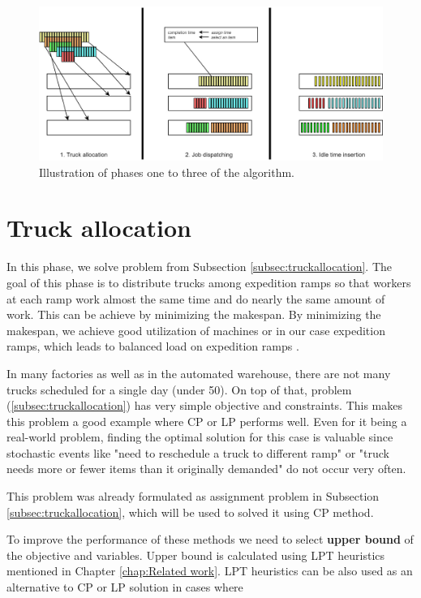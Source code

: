 \documentclass{ctuthesis}
\begin{document}
\begin{figure}[h]
\includegraphics[width=1.0\linewidth]{algo.jpg}
\caption{Illustration of phases one to three of the algorithm.}
\end{figure}

\section{Truck allocation}

In this phase, we solve problem from Subsection \ref{subsec:truckallocation}. The goal of this phase is to distribute trucks among expedition ramps so that workers at each ramp work almost the same time and do nearly the same amount of work. This can be achieve by minimizing the makespan. By minimizing the makespan, we achieve good utilization of machines or in our case expedition ramps, which leads to balanced load on expedition ramps \cite{pinedo}. 

In many factories as well as in the automated warehouse, there are not many trucks scheduled for a single day (under 50). On top of that,  problem (\ref{subsec:truckallocation}) has very simple objective and constraints. This makes this problem a good example where CP or LP performs well. Even for it being a real-world problem, finding the optimal solution for this case is valuable since stochastic events like "need to reschedule a truck to different ramp" or "truck needs more or fewer items than it originally demanded" do not occur very often.

This problem was already formulated as assignment problem in Subsection \ref{subsec:truckallocation}, which will be used to solved it using CP method.

To improve the performance of these methods we need to select \textbf{upper bound} of the objective and variables. Upper bound is calculated using LPT heuristics mentioned in Chapter \ref{chap:Related work}. LPT heuristics can be also used as an alternative to CP or LP solution in cases where 
\end{document}
